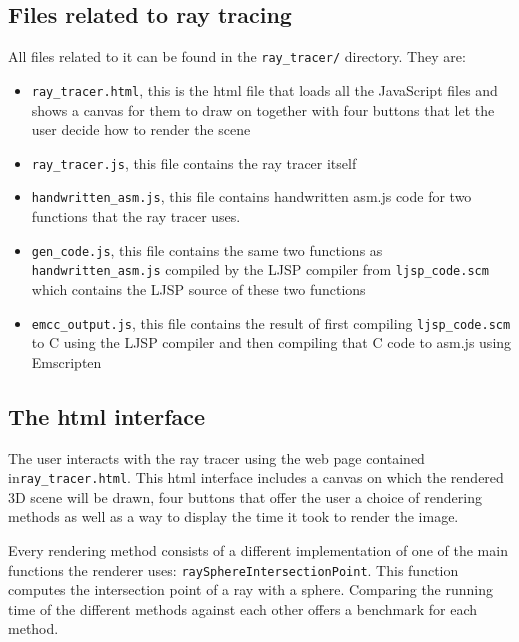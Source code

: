 \documentclass[11pt]{report}
\begin{document}
\subsection{Files related to ray tracing}
All files related to it can be found in the \texttt{ray_tracer/} directory. They are:
\begin{itemize}
\item \texttt{ray_tracer.html}, this is the html file that loads all the JavaScript files and shows a canvas for them to draw on together with four buttons that let the user decide how to render the scene
\item \texttt{ray_tracer.js}, this file contains the ray tracer itself
\item \texttt{handwritten_asm.js}, this file contains handwritten asm.js code for two functions that the ray tracer uses.
\item \texttt{gen_code.js}, this file contains the same two functions as \texttt{handwritten_asm.js} compiled by the LJSP compiler from \texttt{ljsp_code.scm} which contains the LJSP source of these two functions
\item \texttt{emcc_output.js}, this file contains the result of first compiling \texttt{ljsp_code.scm} to C using the LJSP compiler and then compiling that C code to asm.js using Emscripten
\end{itemize}


\subsection{The html interface}
The user interacts with the ray tracer using the web page contained in\texttt{ray_tracer.html}. This html interface includes a canvas on which the rendered 3D scene will be drawn, four buttons that offer the user a choice of rendering methods as well as a way to display the time it took to render the image. %


Every rendering method consists of a different implementation of one of the main functions the renderer uses: \texttt{raySphereIntersectionPoint}. This function computes the intersection point of a ray with a sphere. Comparing the running time of the different methods against each other offers a benchmark for each method.
\end{document}
